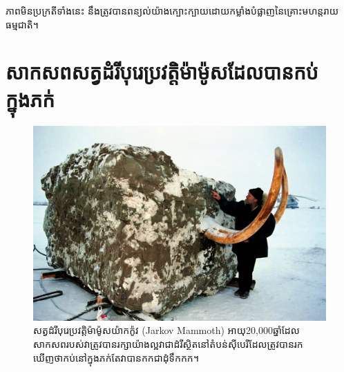 \documentclass[10pt,twocolumn,letterpaper]{article}
\begin{document}
ភាពមិនប្រក្រតីទាំងនេះ នឹងត្រូវបានពន្យល់យ៉ាងក្បោះក្បាយដោយកម្លាំងបំផ្លាញនៃគ្រោះមហន្តរាយធម្មជាតិ។

\section{សាកសពសត្វដំរីបុរេប្រវត្តិម៉ាម៉ូសដែលបានកប់ក្នុងភក់}
\begin{figure}[b]
\begin{center}
   \includegraphics[width=1\linewidth]{jarkov-mammoth.jpg}
\end{center}
   \caption{សត្វដំរីបុរេប្រវត្តិម៉ាម៉ូសយ៉ាកក៉ូវ (Jarkov Mammoth) អាយុ20,000ឆ្នាំដែលសាកសពរបស់វាត្រូវបានរក្សាយ៉ាងល្អ​វាជាដំរីស្ថិតនៅតំបន់ស៊ីបេរីដែលត្រូវបានរកឃើញថាកប់នៅក្នុងភក់តែវាបានកកជាដុំទឹកកក\cite{51}។}
\label{fig:1}
\label{fig:onecol}
\end{figure}
\end{document}
